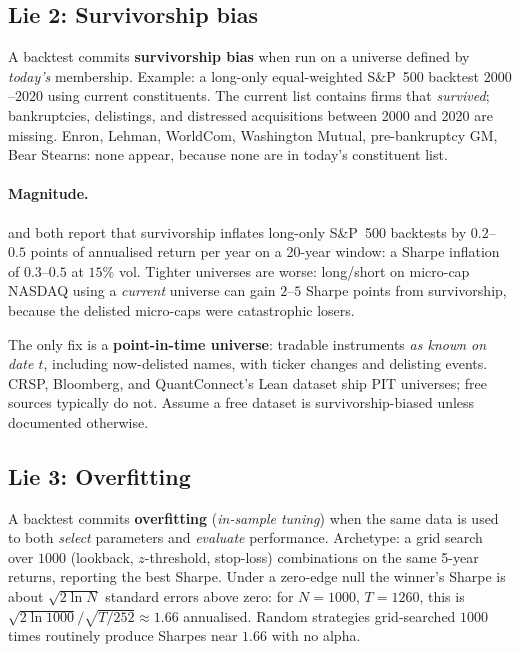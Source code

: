\subsection{Lie 2: Survivorship bias}
\label{subsec:lie_survivorship}

A backtest commits \textbf{survivorship bias} when run on a universe
defined by \emph{today's} membership. Example: a long-only
equal-weighted S\&P~500 backtest $2000$--$2020$ using current
constituents. The current list contains firms that \emph{survived};
bankruptcies, delistings, and distressed acquisitions between 2000
and 2020 are missing. Enron, Lehman, WorldCom, Washington Mutual,
pre-bankruptcy GM, Bear Stearns: none appear, because none are in
today's constituent list.

\paragraph{Magnitude.} \citet{lopezdeprado2018afml} and
\citet{chan2013algorithmic} both report that survivorship inflates
long-only S\&P~500 backtests by $0.2$--$0.5$ points of annualised
return per year on a 20-year window: a Sharpe inflation of
$0.3$--$0.5$ at $15\%$ vol. Tighter universes are worse: long/short
on micro-cap NASDAQ using a \emph{current} universe can gain
$2$--$5$ Sharpe points from survivorship, because the delisted
micro-caps were catastrophic losers.

The only fix is a \textbf{point-in-time universe}: tradable
instruments \emph{as known on date $t$}, including now-delisted
names, with ticker changes and delisting events. CRSP, Bloomberg,
and QuantConnect's Lean dataset ship PIT universes; free sources
typically do not. Assume a free dataset is survivorship-biased
unless documented otherwise.

\subsection{Lie 3: Overfitting}
\label{subsec:lie_overfit}

A backtest commits \textbf{overfitting} (\emph{in-sample tuning})
when the same data is used to both \emph{select} parameters and
\emph{evaluate} performance. Archetype: a grid search over $1000$
(lookback, $z$-threshold, stop-loss) combinations on the same 5-year
returns, reporting the best Sharpe. Under a zero-edge null the
winner's Sharpe is about $\sqrt{2 \ln N}$ standard errors above zero:
for $N = 1000$, $T = 1260$, this is
$\sqrt{2 \ln 1000} / \sqrt{T / 252} \approx 1.66$ annualised.
Random strategies grid-searched $1000$ times routinely produce
Sharpes near $1.66$ with no alpha.

